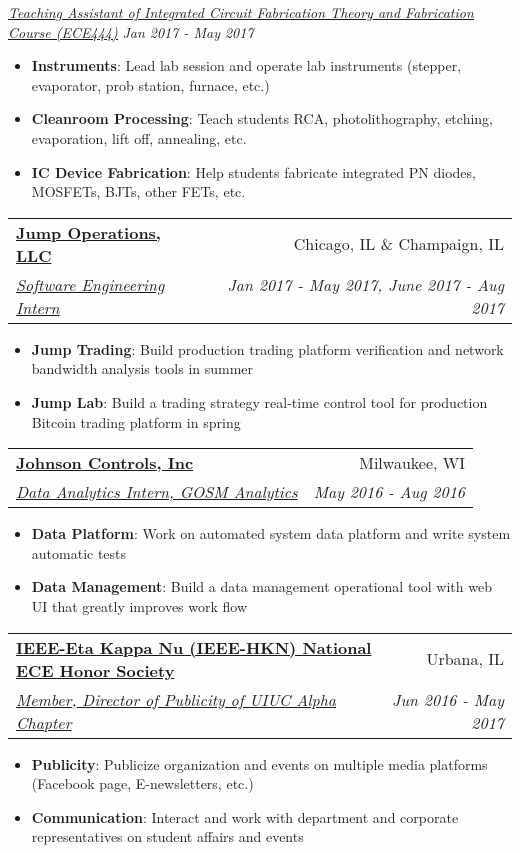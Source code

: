 \documentclass[hidelinks,letterpaper,11pt]{article} %
\makeatletter
\newcommand{\resumeItem}[2]{
  \item\small{
    \textbf{#1}{: #2 \vspace{-2pt}}
  }
}
\newcommand{\positionHeader}[2]{
    \hspace{-8pt}
    \vspace{2pt}  
    \begin{small}
      \underline{\textit{#1}} \hfill \textit{#2} \ \ \ \\
    \end{small}
}
\newcommand{\resumeSubheading}[4]{
  \vspace{-1pt}\item
    \begin{tabular*}{0.97\textwidth}{l@{\extracolsep{\fill}}r}
      \textbf{#1} & #2 \\
      \underline{\textit{\small#3}} & \textit{\small #4} \\
    \end{tabular*}\vspace{-5pt}
}
\newcommand{\resumeItemListStart}{\begin{itemize}}
\newcommand{\resumeItemListEnd}{\end{itemize}\vspace{-5pt}}
\makeatother
\begin{document}
      \vspace{-1pt}
      \positionHeader{\href{http://fabweb.ece.illinois.edu/}{Teaching Assistant of Integrated Circuit Fabrication Theory and Fabrication Course (ECE444)}}{Jan 2017 - May 2017}
      \vspace{-5pt}
      \resumeItemListStart
        \resumeItem{Instruments}
        {Lead lab session and operate lab instruments (stepper, evaporator, prob station, furnace, etc.)}
        \resumeItem{Cleanroom Processing}
        {Teach students RCA, photolithography, etching, evaporation, lift off, annealing, etc.} 
        \resumeItem{IC Device Fabrication}
        {Help students fabricate integrated PN diodes, MOSFETs, BJTs, other FETs, etc.}
      \resumeItemListEnd


    \resumeSubheading
      {\href{http://www.jumptrading.com/}{Jump Operations, LLC}}{Chicago, IL \& Champaign, IL}
      {Software Engineering Intern}{Jan 2017 - May 2017, June 2017 - Aug 2017}
      \resumeItemListStart
        \resumeItem{Jump Trading}
        {Build production trading platform verification and network bandwidth analysis tools in summer}
        \resumeItem{Jump Lab}
        {Build a trading strategy real-time control tool for production Bitcoin trading platform in spring} 
      \resumeItemListEnd

    \resumeSubheading
      {\href{http://www.johnsoncontrols.com/}{Johnson Controls, Inc}}{Milwaukee, WI}
      {Data Analytics Intern, GOSM Analytics}{May 2016 - Aug 2016}
      \resumeItemListStart
        \resumeItem{Data Platform}
        {Work on automated system data platform and write system automatic tests }
        \resumeItem{Data Management}
        {Build a data management operational tool with web UI that greatly improves work flow}
      \resumeItemListEnd

    \resumeSubheading
      {\href{http://hkn.illinois.edu}{IEEE-Eta Kappa Nu (IEEE-HKN) National ECE Honor Society}}{Urbana, IL}
      {Member, Director of Publicity of UIUC Alpha Chapter}{Jun 2016 - May 2017}
      \resumeItemListStart
        \resumeItem{Publicity}
        {Publicize organization and events on multiple media platforms (Facebook page, E-newsletters, etc.)}
        \resumeItem{Communication}
        {Interact and work with department and corporate representatives on student affairs and events}
      \resumeItemListEnd
\end{document}
